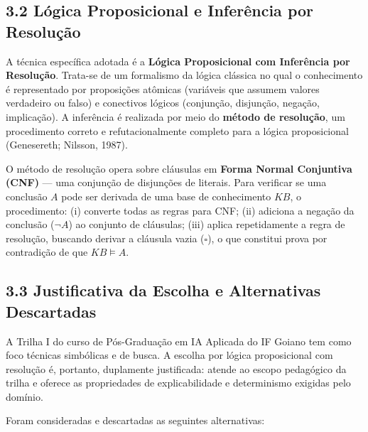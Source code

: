 \documentclass[11pt]{article}
\begin{document}
\subsection{3.2 Lógica Proposicional e Inferência por
Resolução}\label{luxf3gica-proposicional-e-inferuxeancia-por-resoluuxe7uxe3o}

A técnica específica adotada é a \textbf{Lógica Proposicional com
Inferência por Resolução}. Trata-se de um formalismo da lógica clássica
no qual o conhecimento é representado por proposições atômicas
(variáveis que assumem valores verdadeiro ou falso) e conectivos lógicos
(conjunção, disjunção, negação, implicação). A inferência é realizada
por meio do \textbf{método de resolução}, um procedimento correto e
refutacionalmente completo para a lógica proposicional (Genesereth;
Nilsson, 1987).

O método de resolução opera sobre cláusulas em \textbf{Forma Normal
Conjuntiva (CNF)} --- uma conjunção de disjunções de literais. Para
verificar se uma conclusão \(A\) pode ser derivada de uma base de
conhecimento \(KB\), o procedimento: (i) converte todas as regras para
CNF; (ii) adiciona a negação da conclusão (\(\neg A\)) ao conjunto de
cláusulas; (iii) aplica repetidamente a regra de resolução, buscando
derivar a cláusula vazia (\(\square\)), o que constitui prova por
contradição de que \(KB \models A\).

\subsection{3.3 Justificativa da Escolha e Alternativas
Descartadas}\label{justificativa-da-escolha-e-alternativas-descartadas}

A Trilha I do curso de Pós-Graduação em IA Aplicada do IF Goiano tem
como foco técnicas simbólicas e de busca. A escolha por lógica
proposicional com resolução é, portanto, duplamente justificada: atende
ao escopo pedagógico da trilha e oferece as propriedades de
explicabilidade e determinismo exigidas pelo domínio.

Foram consideradas e descartadas as seguintes alternativas:
\end{document}
